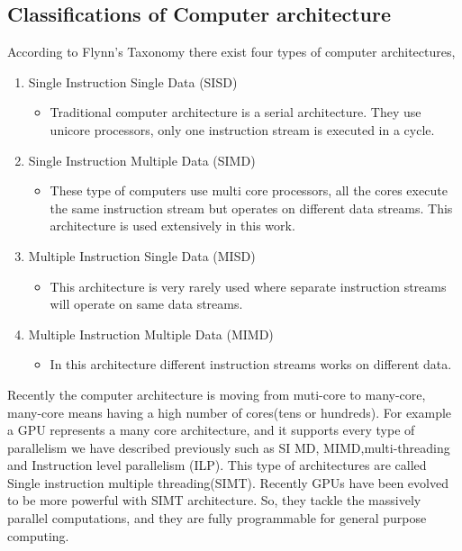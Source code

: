 \subsection{Classifications of Computer architecture}
According to Flynn’s Taxonomy\cite{flynn} there exist four types of computer architectures,
\begin{enumerate} 
\item Single Instruction Single Data (SISD) \hfill
	\begin{itemize} 
	\item Traditional computer architecture is a serial architecture. They use unicore processors, only one instruction stream is executed in a cycle.
	\end{itemize}
\item Single Instruction Multiple Data (SIMD)
\begin{itemize} 
\item These type of computers use multi core processors, all the cores execute the same instruction stream but operates on different data streams. This architecture is used extensively in this work.
\end{itemize}
\item Multiple Instruction Single Data (MISD)
\begin{itemize} 
\item This architecture is very rarely used where separate instruction streams will operate on same data streams.
\end{itemize}
\item Multiple Instruction Multiple Data (MIMD)
\begin{itemize} 
\item In this architecture different instruction streams works on different data.
\end{itemize}
\end{enumerate}
\noindent Recently the computer architecture is moving from muti-core to many-core, many-core means having a high number of cores(tens or hundreds). For example a GPU represents a many core architecture, and it supports every type of parallelism we have described previously such as SI MD, MIMD,multi-threading and Instruction level parallelism (ILP). This type of architectures are called Single instruction multiple threading(SIMT). Recently GPUs have been evolved to be more powerful  with SIMT architecture. So, they tackle the massively parallel computations, and they are fully programmable for general purpose computing.
